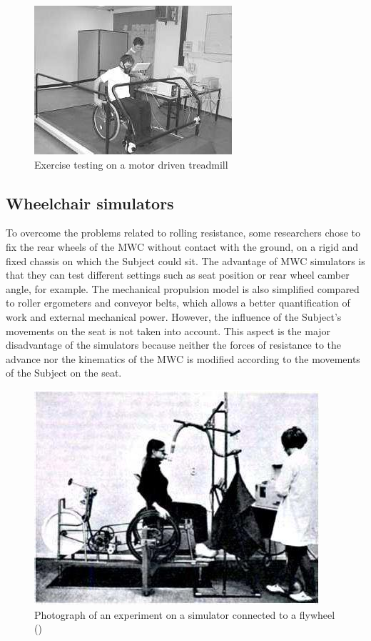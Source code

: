 \begin{figure}[h]
\center
\includegraphics[scale = 40]{images/tapi_roulant}
\caption{ Exercise testing on a motor driven treadmill \cite{van2006manual}}
\label{tapi_roulant}
\end{figure}

\subsection{Wheelchair simulators}
To overcome the problems related to rolling resistance, some researchers chose to fix the rear wheels of the MWC without contact with the ground, on a rigid and fixed chassis on which the Subject could sit. The advantage of MWC simulators is that they can test different settings such as seat position or rear wheel camber angle, for example. The mechanical propulsion model is also simplified compared to roller ergometers and conveyor belts, which allows a better quantification of work and external mechanical power.   However, the influence of the Subject's movements on the seat is not taken into account. This aspect is the major disadvantage of the simulators because neither the forces of resistance to the advance nor the kinematics of the MWC is modified according to the movements of the Subject on the seat.

\begin{figure}[h]
\center
\includegraphics[scale = 30]{images/SFR}
\caption{Photograph of an experiment on a simulator connected to a flywheel (\cite{brattgaard1970energy})}
\label{SFR}
\end{figure}

